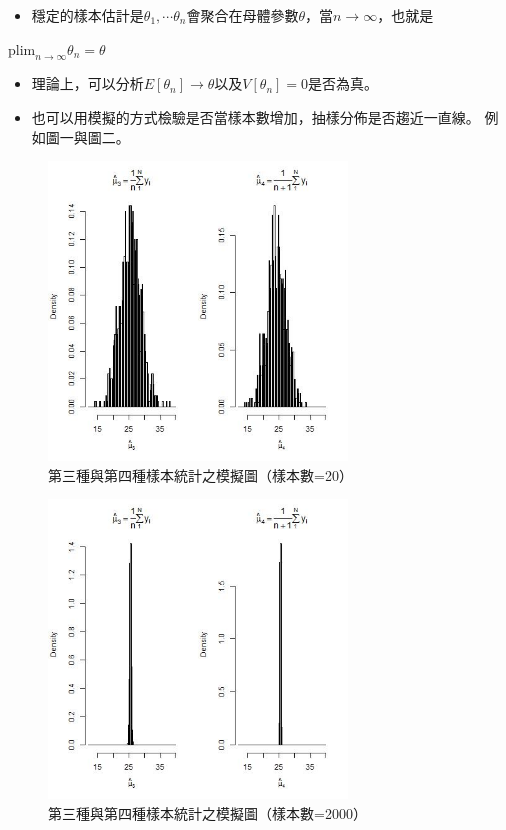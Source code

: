 \documentclass[hyperref,]{ctexart}
\providecommand{\tightlist}{%
  \setlength{\itemsep}{0pt}\setlength{\parskip}{0pt}}
\begin{document}
\begin{itemize}
\tightlist
\item
  穩定的樣本估計是\(\theta_{1},\cdots \theta_{n}\)會聚合在母體參數\(\theta\)，當\(n\rightarrow \infty\)，也就是
\end{itemize}

\begin{center}
${\mathrm {plim}}_{n\rightarrow \infty}\theta_{n}=\theta$
\end{center}

\begin{itemize}
\tightlist
\item
  理論上，可以分析\(E[\theta_{n}]\rightarrow \theta\)以及\(V[\theta_{n}]=0\)是否為真。
\item
  也可以用模擬的方式檢驗是否當樣本數增加，抽樣分佈是否趨近一直線。
  例如圖一與圖二。
\end{itemize}

\begin{figure}
\centering
\includegraphics[width=\textwidth,height=3.125in]{./Fig/unbiasedness_vbig.jpg}
\caption{第三種與第四種樣本統計之模擬圖（樣本數=20）}
\end{figure}

\begin{figure}
\centering
\includegraphics[width=\textwidth,height=3.125in]{./Fig/unbiasedness_vsmall.jpg}
\caption{第三種與第四種樣本統計之模擬圖（樣本數=2000）}
\end{figure}
\end{document}
